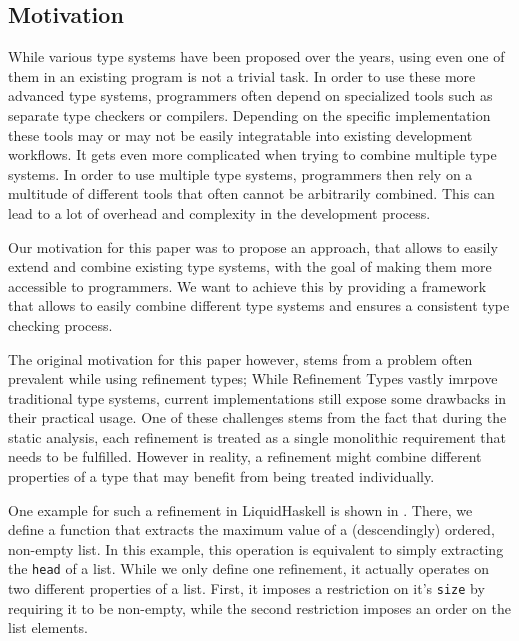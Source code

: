 \subsection{Motivation}
\label{ssec:motivation}

While various type systems have been proposed over the years, using even one of them in an existing program is not a trivial task. In order to use these more advanced type systems, programmers often depend on specialized tools such as separate type checkers or compilers. Depending on the specific implementation these tools may or may not be easily integratable into existing development workflows. It gets even more complicated when trying to combine multiple type systems. In order to use multiple type systems, programmers then rely on a multitude of different tools that often cannot be arbitrarily combined. This can lead to a lot of overhead and complexity in the development process.

Our motivation for this paper was to propose an approach, that allows to easily extend and combine existing type systems, with the goal of making them more accessible to programmers. We want to achieve this by providing a framework that allows to easily combine different type systems and ensures a consistent type checking process.

The original motivation for this paper however, stems from a problem often prevalent while using refinement types; While Refinement Types vastly imrpove traditional type systems, current implementations still expose some drawbacks in their practical usage. One of these challenges stems from the fact that during the static analysis, each refinement is treated as a single monolithic requirement that needs to be fulfilled. However in reality, a refinement might combine different properties of a type that may benefit from being treated individually.

One example for such a refinement in LiquidHaskell is shown in . There, we define a function that extracts the maximum value of a (descendingly) ordered, non-empty list. In this example, this operation is equivalent to simply extracting the \texttt{head} of a list. While we only define one refinement, it actually operates on two different properties of a list. First, it imposes a restriction on it's \texttt{size} by requiring it to be non-empty, while the second restriction imposes an order on the list elements.



